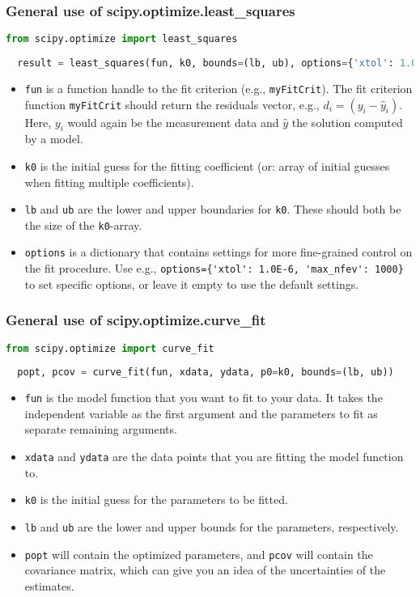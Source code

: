   \begin{frame}[fragile] 
  \frametitle{General use of scipy.optimize.least\_squares}
  \begin{lstlisting}[language=Python]
  from scipy.optimize import least_squares
  
  result = least_squares(fun, k0, bounds=(lb, ub), options={'xtol': 1.0E-6, 'max_nfev': 1000})
  \end{lstlisting}
  \begin{itemize}
    \item \lstinline$fun$ is a function handle to the fit criterion (e.g., \lstinline$myFitCrit$). The fit criterion function \lstinline$myFitCrit$ should return the residuals vector, e.g., $d_i = \left(y_i - \hat{y}_i\right)$. Here, $y_i$ would again be the measurement data and $\hat{y}$ the solution computed by a model.
    \item \lstinline$k0$ is the initial guess for the fitting coefficient (or: array of initial guesses when fitting multiple coefficients).
    \item \lstinline$lb$ and \lstinline$ub$ are the lower and upper boundaries for \lstinline$k0$. These should both be the size of the \lstinline$k0$-array.
    \item \lstinline$options$ is a dictionary that contains settings for more fine-grained control on the fit procedure. Use e.g., \lstinline$options={'xtol': 1.0E-6, 'max_nfev': 1000}$ to set specific options, or leave it empty to use the default settings.
  \end{itemize}  
  \end{frame}
  
  \begin{frame}[fragile] 
  \frametitle{General use of scipy.optimize.curve\_fit}
  \begin{lstlisting}[language=Python]
  from scipy.optimize import curve_fit
  
  popt, pcov = curve_fit(fun, xdata, ydata, p0=k0, bounds=(lb, ub))
  \end{lstlisting}
  \begin{itemize}
    \item \lstinline$fun$ is the model function that you want to fit to your data. It takes the independent variable as the first argument and the parameters to fit as separate remaining arguments.
    \item \lstinline$xdata$ and \lstinline$ydata$ are the data points that you are fitting the model function to.
    \item \lstinline$k0$ is the initial guess for the parameters to be fitted.
    \item \lstinline$lb$ and \lstinline$ub$ are the lower and upper bounds for the parameters, respectively.
    \item \lstinline$popt$ will contain the optimized parameters, and \lstinline$pcov$ will contain the covariance matrix, which can give you an idea of the uncertainties of the estimates.
  \end{itemize}  
  \end{frame}
    

